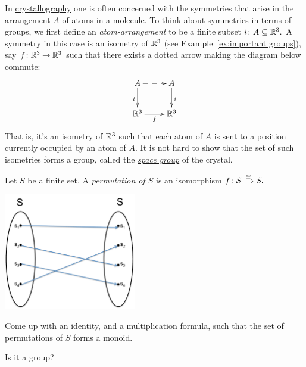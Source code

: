 \documentclass[CT4S-EN-RU]{subfiles}
\begin{document}
\begin{exampleRUS}\label{ex:important groups}
\end{exampleRUS}

\begin{applicationENG}\label{app:groups for symmetry}
In \href{http://en.wikipedia.org/wiki/Crystallography}{\text crystallography} one is often concerned with the symmetries that arise in the arrangement $A$ of atoms in a molecule. To think about symmetries in terms of groups, we first define an {\em atom-arrangement} to be a finite subset $i\colon A\subseteq{\mathbb R}^3.$ A symmetry in this case is an isometry of ${\mathbb R}^3$ (see Example~\ref{ex:important groups}), say $f\colon{\mathbb R}^3\rightarrow{\mathbb R}^3$ such that there exists a dotted arrow making the diagram below commute:
$$
\xymatrix{A\ar@{-->}[r]\ar[d]_i&A\ar[d]^i\\\RR^3\ar[r]_f&\RR^3}
$$
That is, it's an isometry of ${\mathbb R}^3$ such that each atom of $A$ is sent to a position currently occupied by an atom of $A.$ It is not hard to show that the set of such isometries forms a group, called the \href{http://en.wikipedia.org/wiki/Space_group}{\em space group} of the crystal.
\end{applicationENG}

\begin{applicationRUS}\label{app:groups for symmetry}
\end{applicationRUS}

\begin{exerciseENG}\label{exc:permutation}
Let $S$ be a finite set. A {\em permutation of $S$} is an isomorphism $f\colon S\xrightarrow{\cong}S.$ 
\begin{center}
\parbox{2.3in}{
\includegraphics[height=2in]{SetPermutation}}
\end{center}
\sexc Come up with an identity, and a  multiplication formula, such that the set of permutations of $S$ forms a monoid. 
\item Is it a group?
\endsexc
\end{exerciseENG}
\end{document}
